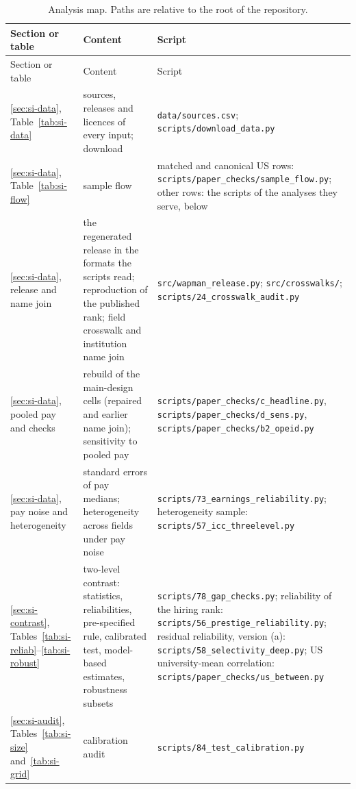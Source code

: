 \documentclass[11pt]{article}
\begin{document}
\begingroup
\scriptsize
\setlength{\tabcolsep}{3pt}
\setlength{\LTcapwidth}{\textwidth}
\begin{longtable}{@{}>{\raggedright\arraybackslash}p{2.7cm}>{\raggedright\arraybackslash}p{4.3cm}>{\raggedright\arraybackslash}p{8.8cm}@{}}
\caption{Analysis map. Paths are relative to the root of the repository.}\label{tab:si-code}\\
\toprule
Section or table & Content & Script \\
\midrule
\endfirsthead
\toprule
Section or table & Content & Script \\
\midrule
\endhead
\bottomrule
\endlastfoot
\ref{sec:si-data}, Table~\ref{tab:si-data} & sources, releases and licences of every input; download & \nolinkurl{data/sources.csv}; \nolinkurl{scripts/download_data.py} \\
\ref{sec:si-data}, Table~\ref{tab:si-flow} & sample flow & matched and canonical US rows: \nolinkurl{scripts/paper_checks/sample_flow.py}; other rows: the scripts of the analyses they serve, below \\
\ref{sec:si-data}, release and name join & the regenerated release in the formats the scripts read; reproduction of the published rank; field crosswalk and institution name join & \nolinkurl{src/wapman_release.py}; \nolinkurl{src/crosswalks/}; \nolinkurl{scripts/24_crosswalk_audit.py} \\
\ref{sec:si-data}, pooled pay and checks & rebuild of the main-design cells (repaired and earlier name join); sensitivity to pooled pay & \nolinkurl{scripts/paper_checks/c_headline.py}, \nolinkurl{scripts/paper_checks/d_sens.py}, \nolinkurl{scripts/paper_checks/b2_opeid.py} \\
\ref{sec:si-data}, pay noise and heterogeneity & standard errors of pay medians; heterogeneity across fields under pay noise & \nolinkurl{scripts/73_earnings_reliability.py}; heterogeneity sample: \nolinkurl{scripts/57_icc_threelevel.py} \\
\ref{sec:si-contrast}, Tables~\ref{tab:si-reliab}--\ref{tab:si-robust} & two-level contrast: statistics, reliabilities, pre-specified rule, calibrated test, model-based estimates, robustness subsets & \nolinkurl{scripts/78_gap_checks.py}; reliability of the hiring rank: \nolinkurl{scripts/56_prestige_reliability.py}; residual reliability, version (a): \nolinkurl{scripts/58_selectivity_deep.py}; US university-mean correlation: \nolinkurl{scripts/paper_checks/us_between.py} \\
\ref{sec:si-audit}, Tables~\ref{tab:si-size} and~\ref{tab:si-grid} & calibration audit & \nolinkurl{scripts/84_test_calibration.py} \\

\end{longtable}
\end{document}

